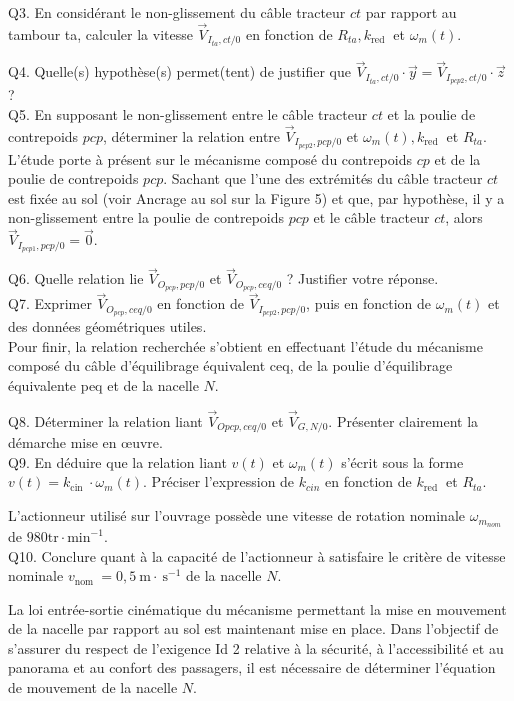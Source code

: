 \documentclass[10pt]{article}
\begin{document}
Q3. En considérant le non-glissement du câble tracteur $c t$ par rapport au tambour ta, calculer la vitesse $\vec{V}_{I_{t a}, c t / 0}$ en fonction de $R_{t a}, k_{\text {red }}$ et $\omega_{m}(t)$.

Q4. Quelle(s) hypothèse(s) permet(tent) de justifier que $\vec{V}_{I_{t a}, c t / 0} \cdot \vec{y}=\vec{V}_{I_{p c p 2}, c t / 0} \cdot \vec{z}$ ?\\
Q5. En supposant le non-glissement entre le câble tracteur $c t$ et la poulie de contrepoids $p c p$, déterminer la relation entre $\vec{V}_{I_{p c p 2}, p c p / 0}$ et $\omega_{m}(t), k_{\text {red }}$ et $R_{t a}$.\\
L'étude porte à présent sur le mécanisme composé du contrepoids $c p$ et de la poulie de contrepoids $p c p$. Sachant que l'une des extrémités du câble tracteur $c t$ est fixée au sol (voir Ancrage au sol sur la Figure 5) et que, par hypothèse, il y a non-glissement entre la poulie de contrepoids $p c p$ et le câble tracteur $c t$, alors $\vec{V}_{I_{p c p 1}, p c p / 0}=\overrightarrow{0}$.

Q6. Quelle relation lie $\vec{V}_{O_{p c p}, p c p / 0}$ et $\vec{V}_{O_{p c p}, c e q / 0}$ ? Justifier votre réponse.\\
Q7. Exprimer $\vec{V}_{O_{p c p}, c e q / 0}$ en fonction de $\vec{V}_{I_{p c p 2}, p c p / 0}$, puis en fonction de $\omega_{m}(t)$ et des données géométriques utiles.\\
Pour finir, la relation recherchée s'obtient en effectuant l'étude du mécanisme composé du câble d'équilibrage équivalent ceq, de la poulie d'équilibrage équivalente peq et de la nacelle $N$.

Q8. Déterminer la relation liant $\vec{V}_{O p c p, c e q / 0}$ et $\vec{V}_{G, N / 0}$. Présenter clairement la démarche mise en œuvre.\\
Q9. En déduire que la relation liant $v(t)$ et $\omega_{m}(t)$ s'écrit sous la forme $v(t)=k_{\text {cin }} \cdot \omega_{m}(t)$. Préciser l'expression de $k_{c i n}$ en fonction de $k_{\text {red }}$ et $R_{t a}$.

L'actionneur utilisé sur l'ouvrage possède une vitesse de rotation nominale $\omega_{m_{n o m}}$ de $980 \mathrm{tr} \cdot \mathrm{min}^{-1}$.\\
Q10. Conclure quant à la capacité de l'actionneur à satisfaire le critère de vitesse nominale $v_{\text {nom }}=0,5 \mathrm{~m} \cdot \mathrm{~s}^{-1}$ de la nacelle $N$.

La loi entrée-sortie cinématique du mécanisme permettant la mise en mouvement de la nacelle par rapport au sol est maintenant mise en place. Dans l'objectif de s'assurer du respect de l'exigence Id 2 relative à la sécurité, à l'accessibilité et au panorama et au confort des passagers, il est nécessaire de déterminer l'équation de mouvement de la nacelle $N$.
\end{document}
